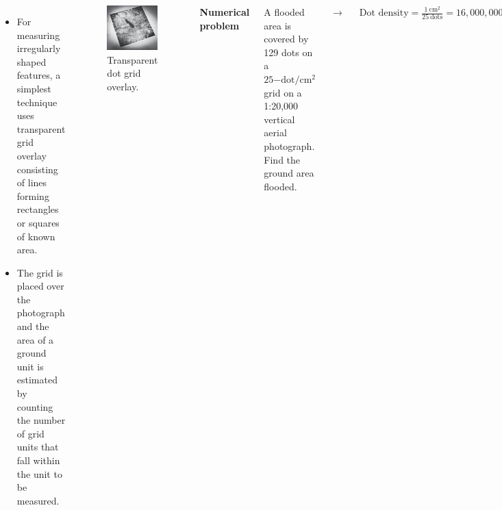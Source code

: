 \documentclass[10pt,dvipsnames,ignorenonframetext,aspectratio=169]{beamer}
\providecommand{\tightlist}{%
  \setlength{\itemsep}{0pt}\setlength{\parskip}{0pt}}
\newcommand{\bcolumns}{\begin{columns}[T, onlytextwidth]}
\newcommand{\ecolumns}{\end{columns}}
\begin{document}
\begin{frame}{}
\protect\hypertarget{section-8}{}
\bcolumns
{}
\footnotesize

\begin{itemize}
\tightlist
\item
  For measuring irregularly shaped features, a simplest technique uses
  transparent grid overlay consisting of lines forming rectangles or
  squares of known area.
\item
  The grid is placed over the photograph and the area of a ground unit
  is estimated by counting the number of grid units that fall within the
  unit to be measured.
\end{itemize}

\begin{figure}
\includegraphics[width=0.7\linewidth]{../images/transparent_dot_grid_overlay} \caption{Transparent dot grid overlay.}\label{fig:transparent-dot-grid}
\end{figure}


\footnotesize

\textbf{Numerical problem}

A flooded area is covered by 129 dots on a \(25\mathrm{-dot/cm^2}\) grid
on a 1:20,000 vertical aerial photograph. Find the ground area flooded.

\(\longrightarrow\)

\(\text{Dot density} = \frac{\mathrm{1~cm^2}}{\mathrm{25~dots}} = 16,000,000 \mathrm{~cm^2/dot} = 0.16 \mathrm{~ha/dot}\)

\(\text{Ground area} = 129\mathrm{~dots} \times 0.16 \mathrm{~ha/dot} = 20.6\mathrm{~ha}\)

\ecolumns
\end{frame}
\end{document}
